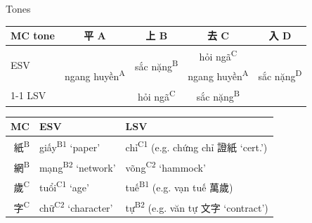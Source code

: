 \documentclass{beamer}
\begin{document}
\begin{frame}[fragile]{Tones}

\begin{tabular}{l|c c c c}
MC tone & 平 A & 上 B & 去 C & 入 D\\ \hline 
\multirow{2}{*}{ESV} & \multirow{3}{*}{ngang huyền\textsuperscript{A}} & \multirow{2}{*}{sắc nặng\textsuperscript{B}} & hỏi ngã\textsuperscript{C} & \multirow{3}{*}{sắc nặng\textsuperscript{D}}\\
 & & & ngang huyền\textsuperscript{A} & \\ \cline{1-1} \cline{3-4}
LSV & & hỏi ngã\textsuperscript{C} & sắc nặng\textsuperscript{B} & \\
\end{tabular}

\bigskip
\begin{tabular}{r|l l}
MC & ESV & LSV \\ \hline
紙\textsuperscript{B} & giấy\textsuperscript{B1} \enquote*{paper}& chỉ\textsuperscript{C1} (e.g. chứng chỉ 證紙 \enquote*{cert.})\\
網\textsuperscript{B} & mạng\textsuperscript{B2} \enquote*{network} & võng\textsuperscript{C2} \enquote*{hammock}\\
歲\textsuperscript{C} & tuổi\textsuperscript{C1} \enquote*{age} & tuế\textsuperscript{B1} (e.g. vạn tuế 萬歲)\\
字\textsuperscript{C} & chữ\textsuperscript{C2} \enquote*{character} & tự\textsuperscript{B2} (e.g. văn tự 文字 \enquote*{contract})\\ 
\end{tabular}

\end{frame}
\end{document}

